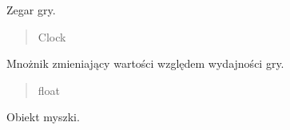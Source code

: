 \documentclass[letterpaper,10pt,polish]{sphinxmanual}
\begin{document}
\begin{fulllineitems}
\begin{fulllineitems}
\begin{quote}
\begin{description}
\end{description}\end{quote}

\end{fulllineitems}


\begin{fulllineitems}
\label{\detokenize{main:main.Main.clock}}
\pysigstartsignatures
{}
\pysigstopsignatures
\sphinxAtStartPar
Zegar gry.
\begin{quote}\begin{description}
\sphinxAtStartPar
Clock

\end{description}\end{quote}

\end{fulllineitems}


\begin{fulllineitems}
\label{\detokenize{main:main.Main.dt}}
\pysigstartsignatures
{}
\pysigstopsignatures
\sphinxAtStartPar
Mnożnik zmieniający wartości względem wydajności gry.
\begin{quote}\begin{description}
\sphinxAtStartPar
float

\end{description}\end{quote}

\end{fulllineitems}


\begin{fulllineitems}
\label{\detokenize{main:main.Main.mouse}}
\pysigstartsignatures
{}
\pysigstopsignatures
\sphinxAtStartPar
Obiekt myszki.
\begin{quote}\begin{description}
\sphinxAtStartPar
{\hyperref[\detokenize{mouse:mouse.Mouse}]{}}

\end{description}\end{quote}


\end{fulllineitems}
\end{fulllineitems}
\end{document}
